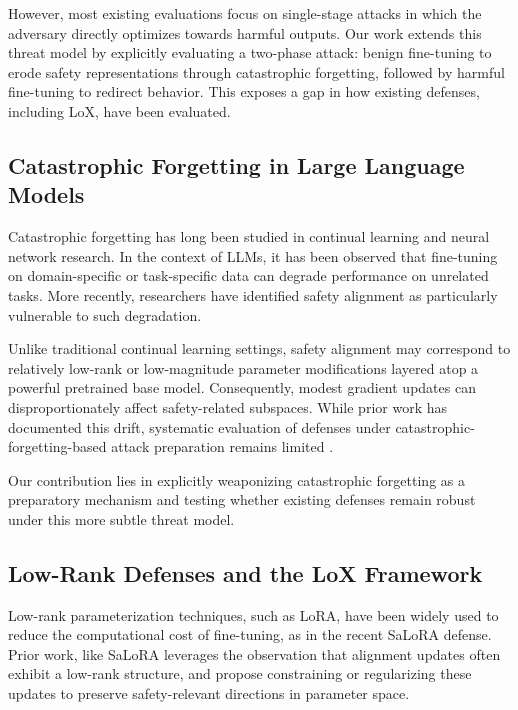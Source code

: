 \documentclass[letterpaper,twocolumn,10pt]{article}
\begin{document}
However, most existing evaluations focus on single-stage attacks in which the adversary directly optimizes towards harmful outputs. Our work extends this threat model by explicitly evaluating a two-phase attack: benign fine-tuning to erode safety representations through catastrophic forgetting, followed by harmful fine-tuning to redirect behavior. This exposes a gap in how existing defenses, including LoX, have been evaluated.

\subsection{Catastrophic Forgetting in Large Language Models}

Catastrophic forgetting has long been studied in continual learning and neural network research. In the context of LLMs, it has been observed that fine-tuning on domain-specific or task-specific data can degrade performance on unrelated tasks\cite{doi:10.1073/pnas.1611835114}. More recently, researchers have identified safety alignment as particularly vulnerable to such degradation\cite{alssum2025unforgottensafetypreservingsafety}.

Unlike traditional continual learning settings, safety alignment may correspond to relatively low-rank or low-magnitude parameter modifications layered atop a powerful pretrained base model. Consequently, modest gradient updates can disproportionately affect safety-related subspaces. While prior work has documented this drift, systematic evaluation of defenses under catastrophic-forgetting-based attack preparation remains limited \cite{ran2025loraleakmembershipinferenceattacks}.

Our contribution lies in explicitly weaponizing catastrophic forgetting as a preparatory mechanism and testing whether existing defenses remain robust under this more subtle threat model.

\subsection{Low-Rank Defenses and the LoX Framework}

Low-rank parameterization techniques, such as LoRA, have been widely used to reduce the computational cost of fine-tuning, as in the recent SaLoRA defense\cite{li2025salorasafetyalignmentpreservedlowrank}. Prior work, like SaLoRA leverages the observation that alignment updates often exhibit a low-rank structure, and propose constraining or regularizing these updates to preserve safety-relevant directions in parameter space.
\end{document}
